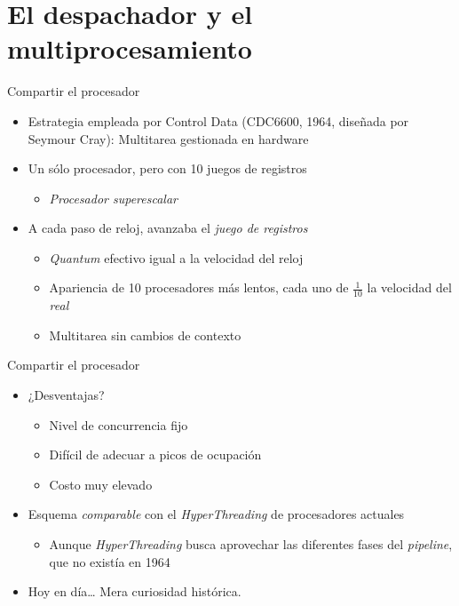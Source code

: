 \documentclass[presentation]{beamer}
\begin{document}
\section{El despachador y el multiprocesamiento}
\label{sec:org4eb2add}

\begin{frame}[label={sec:org46b0cb0}]{Compartir el procesador}
\begin{itemize}
\item Estrategia empleada por Control Data (CDC6600, 1964, diseñada por
Seymour Cray): Multitarea gestionada en hardware
\item Un sólo procesador, pero con 10 juegos de registros
\begin{itemize}
\item \emph{Procesador superescalar}
\end{itemize}
\item A cada paso de reloj, avanzaba el \emph{juego de registros}
\begin{itemize}
\item \emph{Quantum} efectivo igual a la velocidad del reloj
\item Apariencia de 10 procesadores más lentos, cada uno de
\(\frac{1}{10}\) la velocidad del \emph{real}
\item Multitarea sin cambios de contexto
\end{itemize}
\end{itemize}
\end{frame}

\begin{frame}[label={sec:org70a5a8d}]{Compartir el procesador}
\begin{itemize}
\item ¿Desventajas?
\begin{itemize}
\item Nivel de concurrencia fijo
\item Difícil de adecuar a picos de ocupación
\item Costo muy elevado
\end{itemize}
\item Esquema \emph{comparable} con el \emph{HyperThreading} de procesadores actuales
\begin{itemize}
\item Aunque \emph{HyperThreading} busca aprovechar las diferentes fases del
\emph{pipeline}, que no existía en 1964
\end{itemize}
\item Hoy en día\ldots{} Mera curiosidad histórica.
\end{itemize}
\end{frame}
\end{document}
